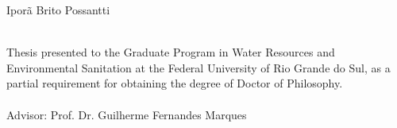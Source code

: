 \documentclass[./main_en.tex]{subfiles}
\begin{document}
\doublespacing %
\large

\newpage
\renewcommand{\headrulewidth}{0pt}
\thispagestyle{fancy}
\fancyhf{} %
\fancyfoot{} %
\fancyfoot[C]{\thepage}

\begin{center}
	\selectfont Iporã Brito Possantti\\
	\vspace{30mm}
	\selectfont \docTitleEn\\
	\vspace{30mm}
\end{center}
\begin{adjustwidth}{250pt}{0pt}
	\singlespacing
	\selectfont Thesis presented to the Graduate Program in Water Resources and Environmental Sanitation at the Federal University of Rio Grande do Sul, as a partial requirement for obtaining the degree of Doctor of Philosophy. \\ \\ Advisor: Prof. Dr. Guilherme Fernandes Marques 
\end{adjustwidth}

\clearpage
\end{document}
